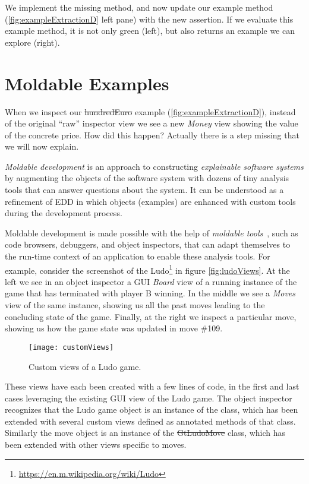 \documentclass[sigplan,anonymous,review,10pt]{acmart}
\begin{document}
We implement the missing method, and now update our example method (\autoref{fig:exampleExtractionD} left pane) with the new assertion.
If we evaluate this example method, it is not only green (left), but also returns an example we can explore (right).

\section{Moldable Examples}\label{sec:moldable}

When we inspect our \st{hundredEuro} example (\autoref{fig:exampleExtractionD}), instead of the original ``raw'' inspector view we see a new \emph{Money} view showing the value of the concrete price.
How did this happen?
Actually there is a step missing that we will now explain.

\emph{Moldable development} is an approach to constructing \emph{explainable software systems} by augmenting the objects of the software system with dozens of tiny analysis tools that can answer questions about the system.
It can be understood as a refinement of EDD in which objects (examples) are enhanced with custom tools during the development process.

Moldable development is made possible with the help of \emph{moldable tools}~\cite{Chis17a}, such as code browsers, debuggers, and object inspectors, that can adapt themselves to the run-time context of an application to enable these analysis tools.
For example, consider the screenshot of the Ludo\footnote{\url{https://en.m.wikipedia.org/wiki/Ludo}} in figure \autoref{fig:ludoViews}.
At the left we see in an object inspector a GUI \emph{Board} view of a running instance of the game that has terminated with player B winning.
In the middle we see a \emph{Moves} view of the same instance, showing us all the past moves leading to the concluding state of the game.
Finally, at the right we inspect a particular move, showing us how the game state was updated in move \#109.

\begin{figure}[h]
  \texttt{[image: customViews]}
  \caption{Custom views of a Ludo game.}
  \label{fig:ludoViews}
\end{figure}

These views have each been created with a few lines of code, in the first and last cases leveraging the existing GUI view of the Ludo game.
The object inspector recognizes that the Ludo game object is an instance of the  class, 
which has been extended with several custom views defined as annotated methods of that class.
Similarly the move object is an instance of the \st{GtLudoMove} class, which has been extended with other views specific to moves.
\end{document}
